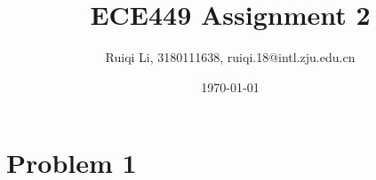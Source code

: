 \documentclass{article}
\title{\textbf{ECE449 Assignment 2}}
\author{Ruiqi Li, 3180111638, ruiqi.18@intl.zju.edu.cn}
\date{\today}
\begin{document}
\maketitle

\section{Problem 1}


% 
% 

    

\end{document}
